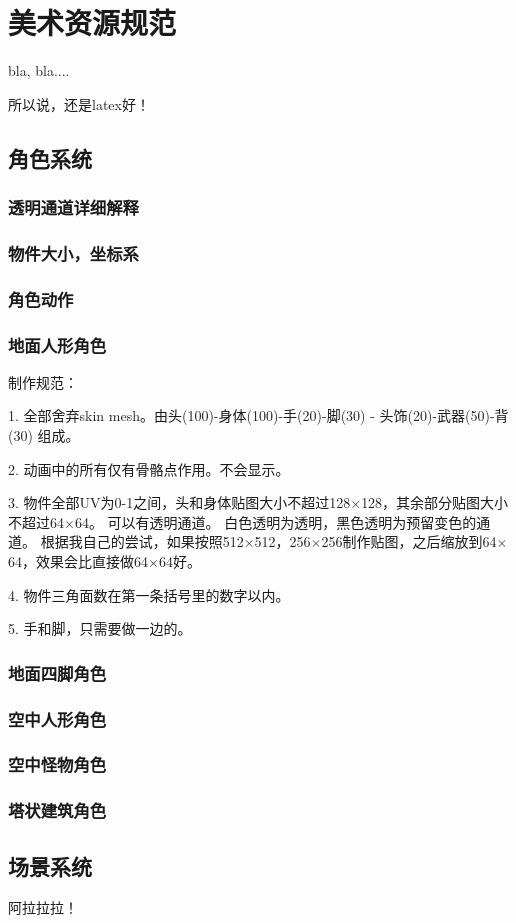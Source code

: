 ﻿\chapter{美术资源规范}

bla, bla....

所以说，还是latex好！

\section{角色系统}

\subsection{透明通道详细解释}

\subsection{物件大小，坐标系}

\subsection{角色动作}

\subsection{地面人形角色}

制作规范：

1. 全部舍弃skin mesh。由头(100)-身体(100)-手(20)-脚(30) - 头饰(20)-武器(50)-背(30) 组成。

2. 动画中的所有仅有骨骼点作用。不会显示。

3. 物件全部UV为0-1之间，头和身体贴图大小不超过128$\times$128，其余部分贴图大小不超过64$\times$64。
可以有透明通道。
白色透明为透明，黑色透明为预留变色的通道。
根据我自己的尝试，如果按照512$\times$512，256$\times$256制作贴图，之后缩放到64$\times$64，效果会比直接做64$\times$64好。

4. 物件三角面数在第一条括号里的数字以内。

5. 手和脚，只需要做一边的。

\subsection{地面四脚角色}

\subsection{空中人形角色}

\subsection{空中怪物角色}

\subsection{塔状建筑角色}

\section{场景系统}

阿拉拉拉！


